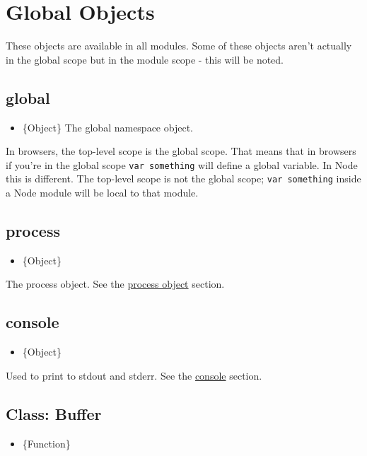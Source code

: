 \section{Global Objects}

These objects are available in all modules. Some of these objects aren't
actually in the global scope but in the module scope - this will be
noted.

\subsection{global}

\begin{itemize}
\item
  \{Object\} The global namespace object.
\end{itemize}

In browsers, the top-level scope is the global scope. That means that in
browsers if you're in the global scope \texttt{var something} will
define a global variable. In Node this is different. The top-level scope
is not the global scope; \texttt{var something} inside a Node module
will be local to that module.

\subsection{process}

\begin{itemize}
\item
  \{Object\}
\end{itemize}

The process object. See the
\href{process.html\#process\_process}{process object} section.

\subsection{console}

\begin{itemize}
\item
  \{Object\}
\end{itemize}

Used to print to stdout and stderr. See the \href{console.html}{console}
section.

\subsection{Class: Buffer}

\begin{itemize}
\item
  \{Function\}
\end{itemize}


